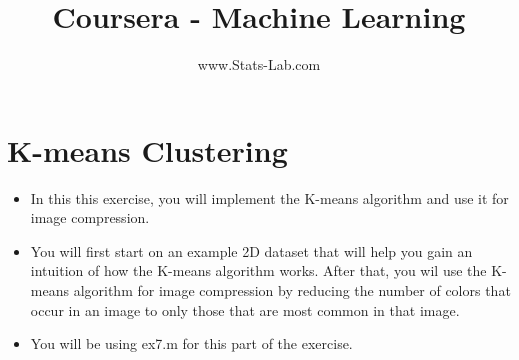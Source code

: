 \documentclass[12pt]{article}
\title{Coursera - Machine Learning}
\author{www.Stats-Lab.com}
\begin{document}
\maketitle


\section{K-means Clustering}


\begin{itemize}
\item In this this exercise, you will implement the K-means algorithm and use it for image compression.

\item You will first start on an example 2D dataset that will help you gain an intuition of
how the K-means algorithm works. After that, you wil use the K-means algorithm for image
compression by reducing the number of colors that occur in an image to only those that are most common in that image.

\item You will be using ex7.m for this part of the exercise.

\end{itemize}
\end{document}
